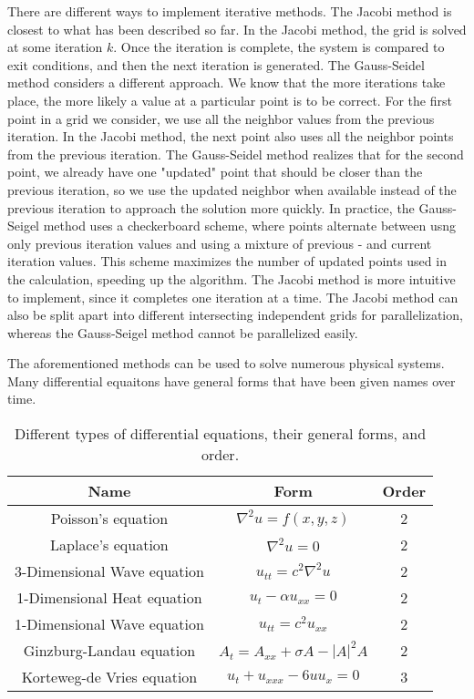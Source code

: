 \documentclass[twocolumn]{article}
\begin{document}
There are different ways to implement iterative methods. The Jacobi method is closest to what has been described so far. In the Jacobi method, the grid is solved at some iteration $k$. Once the iteration is complete, the system is compared to exit conditions, and then the next iteration is generated. The Gauss-Seidel method considers a different approach. We know that the more iterations take place, the more likely a value at a particular point is to be correct. For the first point in a grid we consider, we use all the neighbor values from the previous iteration. In the Jacobi method, the next point also uses all the neighbor points from the previous iteration. The Gauss-Seidel method realizes that for the second point, we already have one "updated" point that should be closer than the previous iteration, so we use the updated neighbor when available instead of the previous iteration to approach the solution more quickly. In practice, the Gauss-Seigel method uses a checkerboard scheme, where points alternate between usng only previous iteration values and using a mixture of previous -  and current iteration values. This scheme maximizes the number of updated points used in the calculation, speeding up the algorithm. The Jacobi method is more intuitive to implement, since it completes one iteration at a time. The Jacobi method can also be split apart into different intersecting independent grids for parallelization, whereas the Gauss-Seigel method cannot be parallelized easily.

The aforementioned methods can be used to solve numerous physical systems. Many differential equaitons have general forms that have been given names over time.

\begin{table*}
\begin{center}
\begin{tabular}{|c|c|c|}
	\hline Name                        & Form                                & Order \\ 
	\hline Poisson's equation          & $\nabla^2 u = f(x,y,z)$             & 2 \\ 
	\hline Laplace's equation          & $\nabla^2 u = 0$                    & 2 \\ 
	\hline 3-Dimensional Wave equation & $u_{tt} = c^2\nabla^2 u$            & 2 \\ 
	\hline 1-Dimensional Heat equation & $u_t -\alpha u_{xx} = 0$            & 2 \\ 
	\hline 1-Dimensional Wave equation & $u_{tt} = c^2 u_{xx} $              & 2 \\ 
	\hline Ginzburg-Landau equation    & $A_t = A_{xx} + \sigma A - |A|^2 A $& 2 \\ 
	\hline Korteweg-de Vries equation  & $u_t + u_{xxx} - 6u u_{x} = 0 $     & 3 \\ 
	\hline 
\end{tabular}  
\caption{Different types of differential equations, their general forms, and order.}
\label{eq:diff_equations}
\end{center}
\end{table*}
\end{document}
